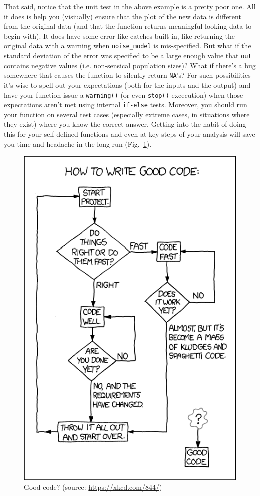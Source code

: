\documentclass[12pt,letterpaper]{article}
\begin{document}
That said, notice that the unit test in the above example is a pretty poor one.
All it does is help you (visiually) ensure that the plot of the new data is different from the original data (and that the function returns meaningful-looking data to begin with).
It does have some error-like catches built in, like returning the original data with a warning when \texttt{noise\_model} is mis-specified.
But what if the standard deviation of the error was specified to be a large enough value that \texttt{out} contains negative values (i.e. non-sensical population sizes)?
What if there's a bug somewhere that causes the function to silently return \texttt{NA}'s?
For such possibilities it's wise to spell out your expectations (both for the inputs and the output) and have your function issue a \texttt{warning()} (or even \texttt{stop()} excecution) when those expectations aren't met using internal \texttt{if-else} tests.
Moreover, you should run your function on several test cases (especially extreme cases, in situations where they exist) where you know the correct answer.
Getting into the habit of doing this for your self-defined functions and even at key steps of your analysis will save you time and headache in the long run (Fig.~\ref{fig:goodcode}).

\begin{figure}[H]
	\centering
	\includegraphics[width=0.6\linewidth]{figs/goodcode.png}
	\caption{Good code? (source: \url{https://xkcd.com/844/})}
	\label{fig:goodcode}
\end{figure}
\end{document}
